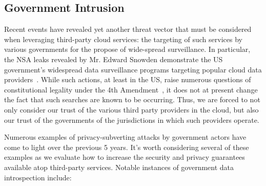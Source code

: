 \subsection{Government Intrusion}

Recent events have revealed yet another threat vector that must be
considered when leveraging third-party cloud services: the targeting
of such services by various governments for the propose of wide-spread
surveillance. In particular, the NSA leaks revealed by Mr. Edward
Snowden demonstrate the US government's widespread data surveillance
programs targeting popular cloud data
providers~\cite{greenwald-prism}. While such actions, at least in the
US, raise numerous questions of constitutional legality under the 4th
Amendment~\cite{us-constitution-amend4}, it does not at present change
the fact that such searches are known to be occurring. Thus, we are
forced to not only consider our trust of the various third party
providers in the cloud, but also our trust of the governments of the
jurisdictions in which such providers operate.

Numerous examples of privacy-subverting attacks by government actors
have come to light over the previous 5 years. It's worth considering
several of these examples as we evaluate how to increase the security
and privacy guarantees available atop third-party services. Notable
instances of government data introspection include:

